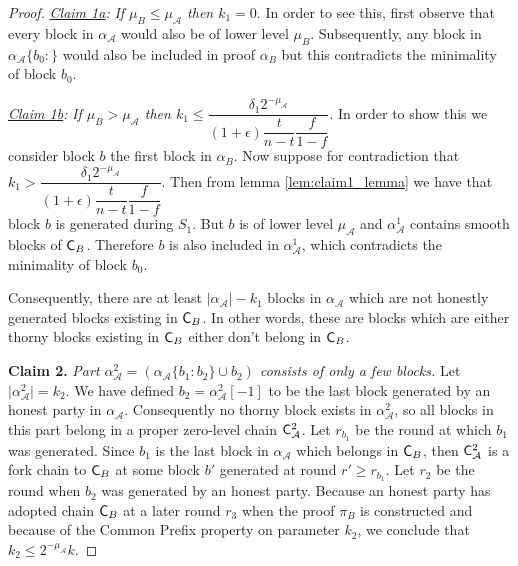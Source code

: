 \begin{proof}
\textit{\underline{Claim 1a}:} \textit{If $\mu_B \leq \mu_\mathcal{A}$ then $k_1 = 0$}. In order to see this, first observe that every block in $\alpha_\mathcal{A}$ would also be of lower level $\mu_B$. Subsequently, any block in $\alpha_\mathcal{\mathcal{A}}\{b_0{:}\}$ would also be included in proof $\alpha_B$ but this contradicts the minimality of block $b_0$.

\textit{\underline{Claim 1b}:} \textit{If $\mu_B > \mu_\mathcal{A}$ then $k_1 \leq \dfrac{\delta_1 2^{-\mu_\mathcal{A}}}{(1+\epsilon)\dfrac{t}{n-t}\dfrac{f}{1-f}}$}. In order to show this we consider block $b$ the first block in $\alpha_B$. Now suppose for contradiction that $k_1 > \dfrac{\delta_1 2^{-\mu_\mathcal{A}}}{(1+\epsilon)\dfrac{t}{n-t}\dfrac{f}{1-f}}$. Then from lemma \ref{lem:claim1_lemma} we have that block $b$ is generated during $S_1$. But $b$ is of lower level $\mu_\mathcal{A}$ and $\alpha^1_\mathcal{A}$ contains smooth blocks of $\mathsf{C}_B$. Therefore $b$ is also included in $\alpha^1_\mathcal{A}$, which contradicts the minimality of block $b_0$.

Consequently, there are at least $\lvert \alpha_\mathcal{A} \rvert - k_1$ blocks in $\alpha_\mathcal{A}$ which are not honestly generated blocks existing in $\mathsf{C}_B$. In other words, these are blocks which are either thorny blocks existing in $\mathsf{C}_B$ either don't belong in $\mathsf{C}_B$.

\textbf{Claim 2.}
\textit{Part $\alpha_\mathcal{A}^2 = (\alpha_\mathcal{A}\{b_1:b_2\} \cup b_2)$ consists of only a few blocks.} Let $ \lvert \alpha_\mathcal{A}^2 \rvert = k_2$. We have defined $b_2 = \alpha_\mathcal{A}^2[-1]$ to be the last block generated by an honest party in $\alpha_\mathcal{A}$. Consequently no thorny block exists in $\alpha_\mathcal{A}^2$, so all blocks in this part belong in a proper zero-level chain $\mathsf{C}_\mathcal{A}^2$.  Let $r_{b_1}$ be the round at which $b_1$ was generated. Since $b_1$ is the last block in $\alpha_\mathcal{A}$ which belongs in $\mathsf{C}_B$, then $\mathsf{C}_\mathcal{A}^2$ is a fork chain to $\mathsf{C}_B$ at some block $b'$ generated at round $r' \geq r_{b_1}$. Let $r_2$ be the round when $b_2$ was generated by an honest party. Because an honest party has adopted chain $\mathsf{C}_B$ at a later round $r_3$ when the proof $\pi_B$ is constructed and because of the Common Prefix property on parameter $k_2$, we conclude that $k_2 \leq 2^{-\mu_\mathcal{A}}k$.


\end{proof}
